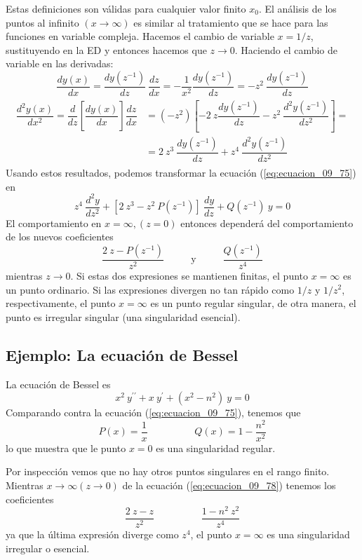 \par
Estas definiciones son válidas para cualquier valor finito $x_{0}$. El análisis de los puntos al infinito $(x \to \infty)$ es similar al tratamiento que se hace para las funciones en variable compleja. Hacemos el cambio de variable $x = 1/z$, sustituyendo en la ED y entonces hacemos que $z \to 0$. Haciendo el cambio de variable en las derivadas:
\begin{equation}
\dfrac{dy(x)}{dx} = \dfrac{d y(z^{-1})}{d z} \: \dfrac{dz}{dx} = - \dfrac{1}{x^{2}} \dfrac{dy(z^{-1})}{dz} = -z^{2} \: \dfrac{dy(z^{-1})}{dz}
\label{eq:ecuacion_09_76}
\end{equation}
\begin{align}
\begin{aligned}
\dfrac{d^{2} y(x)}{d x^{2}} = \dfrac{d}{dz} \left[ \dfrac{dy(x)}{dx} \right] \dfrac{dz}{dx} &= (-z^{2}) \left[ -2 \: z \dfrac{dy(z^{-1})}{dz} - z^{2} \: \dfrac{d^{2} y(z^{-1})}{dz^{2}} \right] = \\
&= 2 \: z^{3} \: \dfrac{dy(z^{-1})}{dz} + z^{4} \: \dfrac{d^{2}y(z^{-1})}{dz^{2}}
\end{aligned}
\end{align}
Usando estos resultados, podemos transformar la ecuación (\ref{eq:ecuacion_09_75}) en
\begin{equation}
z^{4} \: \dfrac{d^{2} y}{d z^{2}} + [ 2 \: z^{3} - z^{2} \: P(z^{-1})] \: \dfrac{d y}{d z} + Q(z^{-1}) \: y = 0
\label{eq:ecuacion_09_78}
\end{equation}
El comportamiento en $x = \infty, (z = 0)$ entonces dependerá del comportamiento de los nuevos coeficientes
\[ \dfrac{2 \: z - P(z^{-1})}{z^{2}} \hspace{1cm} \text{ y } \hspace{1cm} \dfrac{Q(z^{-1})}{z^{4}}\]
mientras $z \to 0$.
Si estas dos expresiones se mantienen finitas, el punto $x = \infty$ es un punto ordinario. Si las expresiones divergen no tan rápido como $1/z$ y $1/z^{2}$, respectivamente, el punto $x = \infty$ es un punto regular singular, de otra manera, el punto es irregular singular (una singularidad esencial).
\subsection*{Ejemplo: La ecuación de Bessel}
La ecuación de Bessel es
\begin{equation}
x^{2} \: y^{\prime \prime} + x \: y^{\prime} + (x^{2} - n^{2}) \: y = 0
\label{eq:ecuacion_09_79}
\end{equation}
Comparando contra la ecuación (\ref{eq:ecuacion_09_75}), tenemos que
\[ P(x) =  \dfrac{1}{x} \hspace{2cm} Q(x) = 1 - \dfrac{n^{2}}{x^{2}}\]
lo que muestra que le punto $x = 0$ es una singularidad regular.
\par
Por inspección vemos que no hay otros puntos singulares en el rango finito. Mientras $x \to \infty (z \to 0)$ de la ecuación (\ref{eq:ecuacion_09_78}) tenemos los coeficientes
\[ \dfrac{2 \:z - z}{z^{2}} \hspace{2cm} \dfrac{1 - n^{2} \: z^{2}}{z^{4}}\]
ya que la última expresión diverge como $z^{4}$, el punto $x = \infty$ es una singularidad irregular o esencial.
